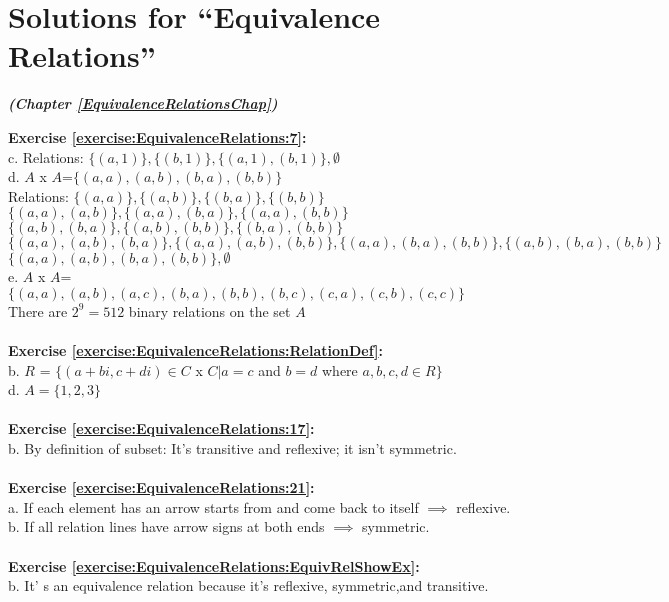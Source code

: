 \section{Solutions for  ``Equivalence Relations''}
\noindent\textbf{\textit{ (Chapter \ref{EquivalenceRelationsChap})}}\bigskip

\noindent\textbf{Exercise \ref{exercise:EquivalenceRelations:7}:}\\
c. Relations: $\{(a,1)\},\{(b,1)\},\{(a,1),(b,1)\},\emptyset$\\
d. $A$ x $A$=$\{(a,a),(a,b),(b,a),(b,b)\}$\\
Relations: $\{(a,a)\},\{(a,b)\}, \{(b,a)\}, \{(b,b)\}$\\
$\{(a,a),(a,b)\}, \{(a,a),(b,a)\}, \{(a,a),(b,b)\}$\\
$\{(a,b),(b,a)\}, \{(a,b),(b,b)\}, \{(b,a),(b,b)\}$\\
$\{(a,a),(a,b),(b,a)\}, \{(a,a),(a,b),(b,b)\}, \{(a,a),(b,a),(b,b)\}, \{(a,b),(b,a),(b,b)\}$\\
$\{(a,a),(a,b),(b,a),(b,b)\},\emptyset$\\
e. $A$ x $A$=$\{(a,a),(a,b),(a,c),(b,a),(b,b),(b,c),(c,a),(c,b),(c,c)\}$\\
There are $2^9=512$ binary relations on the set $A$\\
\\
\textbf{Exercise \ref{exercise:EquivalenceRelations:RelationDef}:}\\
b. $R$ = $\{(a+bi,c+di)\in C$ x $C | a=c$ and $b=d$ where $a,b,c,d\in R\}$\\
d. $A=\{1,2,3\}$\\
\\
\textbf{Exercise \ref{exercise:EquivalenceRelations:17}:}\\
b. By definition of subset: It's transitive and reflexive; it isn't symmetric.\\
\\
\textbf{Exercise \ref{exercise:EquivalenceRelations:21}:}\\
a. If each element has an arrow starts from and come back to itself $\implies$  reflexive.\\
b. If all relation lines have arrow signs at both ends $\implies$  symmetric.\\
\\
\textbf{Exercise \ref{exercise:EquivalenceRelations:EquivRelShowEx}:}\\
b. It' s an equivalence relation because it's reflexive, symmetric,and transitive.\\
